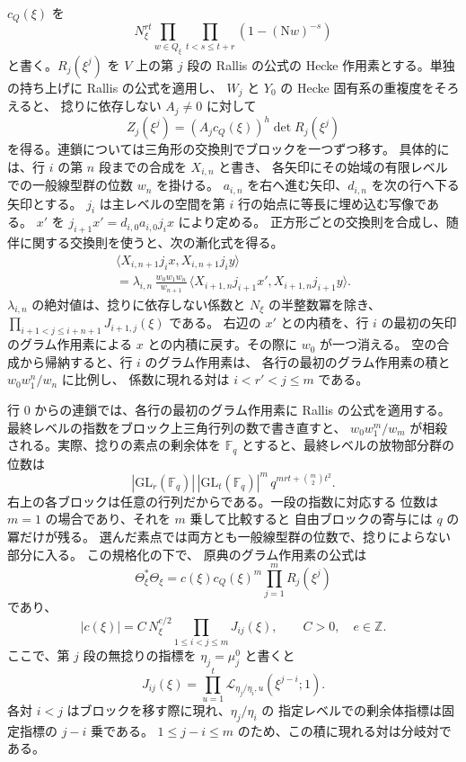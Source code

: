 

\(c_Q(\xi)\) を
\[
 N_\xi^{rt}\prod_{w\in Q_\xi}\prod_{t<s\le t+r}(1-(\mathrm Nw)^{-s})
\]
と書く。\(R_j(\xi^j)\) を \(V\) 上の第 \(j\) 段の Rallis の公式の
Hecke 作用素とする。単独の持ち上げに Rallis の公式を適用し、
\(W_j\) と \(Y_0\) の Hecke 固有系の重複度をそろえると、
捻りに依存しない \(A_j\ne0\) に対して
\[
 Z_j(\xi^j)=(A_jc_Q(\xi))^h\det R_j(\xi^j)
\]
を得る。連鎖については三角形の交換則でブロックを一つずつ移す。
具体的には、行 \(i\) の第 \(n\) 段までの合成を \(X_{i,n}\) と書き、
各矢印にその始域の有限レベルでの一般線型群の位数 \(w_n\) を掛ける。
\(a_{i,n}\) を右へ進む矢印、\(d_{i,n}\) を次の行へ下る矢印とする。
\(j_i\) は主レベルの空間を第 \(i\) 行の始点に等長に埋め込む写像である。
\(x'\) を \(j_{i+1}x'=d_{i,0}a_{i,0}j_i x\) により定める。
正方形ごとの交換則を合成し、随伴に関する交換則を使うと、次の漸化式を得る。
\begin{multline*}
  \langle X_{i,n+1}j_i x,X_{i,n+1}j_i y\rangle\\
   = \lambda_{i,n}\,\frac{w_0w_1w_n}{w_{n+1}}\,
     \langle X_{i+1,n}j_{i+1}x',X_{i+1,n}j_{i+1}y\rangle.
\end{multline*}
\(\lambda_{i,n}\) の絶対値は、捻りに依存しない係数と \(N_\xi\) の半整数冪を除き、
\(\prod_{i+1<j\le i+n+1}J_{i+1,j}(\xi)\) である。
右辺の \(x'\) との内積を、行 \(i\) の最初の矢印のグラム作用素による
\(x\) との内積に戻す。その際に \(w_0\) が一つ消える。
空の合成から帰納すると、行 \(i\) のグラム作用素は、
各行の最初のグラム作用素の積と \(w_0w_1^n/w_n\) に比例し、
係数に現れる対は \(i<r'<j\le m\) である。

行 \(0\) からの連鎖では、各行の最初のグラム作用素に Rallis の公式を適用する。
最終レベルの指数をブロック上三角行列の数で書き直すと、
\(w_0w_1^m/w_m\) が相殺される。実際、捻りの素点の剰余体を
\(\mathbb F_q\) とすると、最終レベルの放物部分群の位数は
\[
 |\mathrm{GL}_{r}(\mathbb F_q)|\,|\mathrm{GL}_{t}(\mathbb F_q)|^m\,
     q^{mrt+\binom{m}{2}t^2}.
\]
右上の各ブロックは任意の行列だからである。一段の指数に対応する
位数は \(m=1\) の場合であり、それを \(m\) 乗して比較すると
自由ブロックの寄与には \(q\) の冪だけが残る。
選んだ素点では両方とも一般線型群の位数で、捻りによらない部分に入る。
この規格化の下で、
原典のグラム作用素の公式は
\[
 \Theta_\xi^*\Theta_\xi
       = c(\xi)c_Q(\xi)^m \prod_{j=1}^m R_j(\xi^j)
\]
であり、
\[
 |c(\xi)| = C\,N_\xi^{e/2}\prod_{1\le i<j\le m} J_{ij}(\xi),
 \qquad C>0,\quad e\in\mathbb Z.
\]
ここで、第 \(j\) 段の無捻りの指標を \(\eta_j=\mu_j^0\) と書くと
\[
 J_{ij}(\xi)=
   \prod_{u=1}^{t}\mathcal L_{\eta_j/\eta_i,u}(\xi^{j-i};1).
\]
各対 \(i<j\) はブロックを移す際に現れ、\(\eta_j/\eta_i\) の
指定レベルでの剰余体指標は固定指標の \(j-i\) 乗である。
\(1\le j-i\le m\) のため、この積に現れる対は分岐対である。

